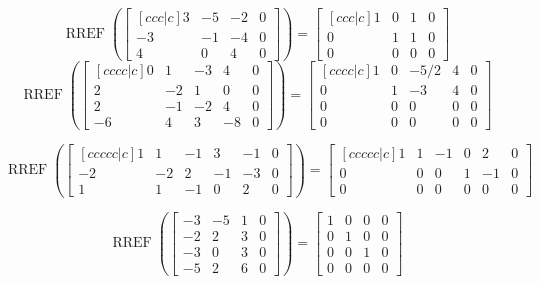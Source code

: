 \documentclass{article}
\DeclareMathOperator{\RREF}{RREF}
\begin{document}
%
\[\RREF\left( \begin{bmatrix}[ccc|c]
3 & -5 & -2 &0 \\
-3 & -1 & -4 & 0\\
4 & 0 & 4 & 0
\end{bmatrix} \right) 
= \begin{bmatrix}[ccc|c]
1 & 0 &1 & 0 \\
0 & 1 & 1 & 0 \\
0 & 0 & 0 & 0 
\end{bmatrix}\]
%
\[\RREF\left( \begin{bmatrix}[cccc|c]
0 & 1 & -3 & 4 &0  \\
2 & -2 &1 & 0 & 0 \\
2 & -1 & -2 & 4 & 0\\
-6 & 4 & 3 & -8 & 0
\end{bmatrix} \right) 
= \begin{bmatrix}[cccc|c] 
1 & 0 & -5/2 & 4 &0  \\
0 & 1 & -3 & 4 & 0 \\
0 & 0 & 0 & 0 & 0\\
0 & 0 & 0 & 0 & 0
\end{bmatrix}
\]

\[\RREF\left( \begin{bmatrix}[ccccc|c]
1 & 1 & -1 &3 &-1 &0  \\
-2 & -2 &2 & -1 & -3 &0\\
1 & 1 & -1 & 0 & 2 &0
\end{bmatrix} \right) 
= \begin{bmatrix}[ccccc|c] 
1 & 1 & -1 & 0 &2 & 0  \\
0 & 0 & 0 & 1& -1 &0\\
0 & 0 & 0 & 0 & 0 &0
\end{bmatrix}
\]



\[
  \RREF \left( \begin{bmatrix}
    -3 & -5 & 1 & 0 \\
    -2 & 2 & 3 & 0 \\
    -3 & 0 & 3 & 0 \\
    -5 & 2 & 6 & 0
  \end{bmatrix} \right) = \begin{bmatrix}
    1 & 0 & 0 & 0 \\
    0 & 1 & 0 & 0 \\
    0 & 0 & 1 & 0 \\
    0 & 0 & 0 & 0
  \end{bmatrix}
\]
\end{document}
